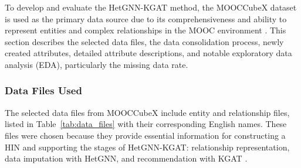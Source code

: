\documentclass{ieeeaccess}
\begin{document}
To develop and evaluate the HetGNN-KGAT method, the MOOCCubeX dataset is used as the primary data source due to its comprehensiveness and ability to represent entities and complex relationships in the MOOC environment \cite{yu2021mooccubex}. This section describes the selected data files, the data consolidation process, newly created attributes, detailed attribute descriptions, and notable exploratory data analysis (EDA), particularly the missing data rate.

\subsubsection{Data Files Used}

The selected data files from MOOCCubeX include entity and relationship files, listed in Table~\ref{tab:data_files} with their corresponding English names. These files were chosen because they provide essential information for constructing a HIN and supporting the stages of HetGNN-KGAT: relationship representation, data imputation with HetGNN, and recommendation with KGAT \cite{zhang2019hetgnn, shi2018heterogeneous, wang2019kgat}.
\end{document}
